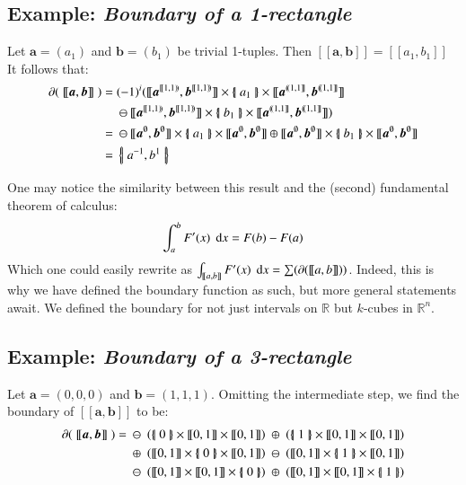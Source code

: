 \subsection{Example: \emph{Boundary of a 1-rectangle}}
Let $\boldsymbol{a}= (a_1)$ and $\boldsymbol{b} = (b_1)$ be trivial 1-tuples. 
Then $[\![\boldsymbol{a}, \boldsymbol{b}]\!] = [\![a_1, b_1]\!]$
It follows that:
\begin{align*}
	\partial ( \; [\![ \boldsymbol{a}, \boldsymbol{b} ]\!] \; )
	=& \; (-1)^i ( [\![\boldsymbol{a}^{[\![1,1)\!)}, \boldsymbol{b}^{[\![1,1)\!)} ]\!]
	\times \hset{a_1} \times
	[\![\boldsymbol{a}^{(\!(1,1]\!]}, \boldsymbol{b}^{(\!(1,1]\!]} ]\!]\\
	&\; \ominus
	[\![\boldsymbol{a}^{[\![1,1)\!)}, \boldsymbol{b}^{[\![1,1)\!)} ]\!]
	\times \hset{b_1} \times
	[\![\boldsymbol{a}^{(\!(1,1]\!]}, \boldsymbol{b}^{(\!(1,1]\!]} ]\!] )\\
	=& \; \ominus [\![\boldsymbol{a}^{\emptyset}, \boldsymbol{b}^{\emptyset} ]\!]
	\times \hset{a_1} \times
	[\![\boldsymbol{a}^{\emptyset}, \boldsymbol{b}^{\emptyset} ]\!]
	\oplus
	[\![\boldsymbol{a}^{\emptyset}, \boldsymbol{b}^{\emptyset} ]\!]
	\times \hset{b_1} \times
	[\![\boldsymbol{a}^{\emptyset}, \boldsymbol{b}^{\emptyset} ]\!] \\
	=& \; \hset{a^{-1}, b^{1}}
\end{align*}

One may notice the similarity between this result and the (second) fundamental theorem of calculus:
\begin{equation*}
	\int_a^b F'(x) \; \mathop{}\!\mathrm{d} x = F(b) - F(a)
\end{equation*}
Which one could easily rewrite as $\int_{[\![a,b]\!]} F'(x) \; \mathop{}\!\mathrm{d} x = \sum (\partial([\![a,b]\!]))$.
Indeed, this is why we have defined the boundary function as such, but more general statements await.
We defined the boundary for not just intervals on $\mathbb{R}$ but $k$-cubes in $\mathbb{R}^n$.




\subsection{Example: \emph{Boundary of a 3-rectangle}}
Let $\boldsymbol{a} = (0,0,0)$ and $\boldsymbol{b} = (1,1,1)$.
Omitting the intermediate step, we find the boundary of $[\![ \boldsymbol{a}, \boldsymbol{b} ]\!]$ to be:
\begin{align*}
	\partial ( \; [\![ \boldsymbol{a} , \boldsymbol{b} ]\!] \; ) =
	& 	\; \ominus \; \left( \hset{0} \times [\![0,1]\!] \times [\![0,1]\!] \right)
		\; \oplus \; \left( \hset{1} \times [\![0,1]\!] \times [\![0,1]\!] \right)
	\\& 	\; \oplus \; \left( [\![0,1]\!] \times \hset{0} \times [\![0,1]\!] \right)
	 	\; \ominus \; \left( [\![0,1]\!] \times \hset{1} \times [\![0,1]\!] \right)
	\\& 	\; \ominus \; \left( [\![0,1]\!] \times [\![0,1]\!] \times \hset{0} \right)
	  	\; \oplus \; \left( [\![0,1]\!] \times [\![0,1]\!] \times \hset{1} \right)
\end{align*}

